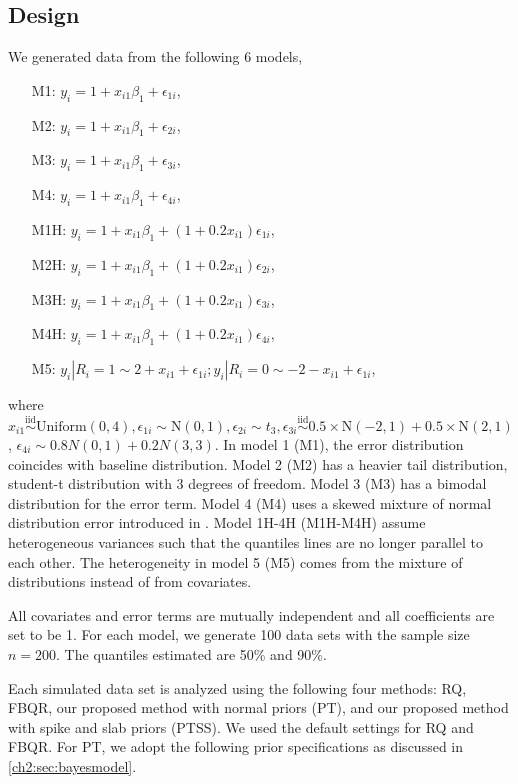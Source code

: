 \documentclass[12pt]{article}
\begin{document}
\subsection{Design}
We generated data from the following 6 models,
\begin{itemize}
\item [M1:] $y_i = 1 + x_{i1}\beta_1 + \epsilon_{1i}$,
\item [M2:] $y_i = 1 + x_{i1}\beta_1 + \epsilon_{2i}$,
\item [M3:] $y_i = 1 + x_{i1}\beta_1 + \epsilon_{3i}$,
\item [M4:] $y_i = 1 + x_{i1}\beta_1 + \epsilon_{4i}$,
\item [M1H:] $y_i = 1 + x_{i1}\beta_1 + (1 + 0.2x_{i1})
  \epsilon_{1i}$,
\item [M2H:] $y_i = 1 + x_{i1}\beta_1 + (1 + 0.2x_{i1})
  \epsilon_{2i}$,
\item [M3H:] $y_i = 1 + x_{i1}\beta_1 + (1 + 0.2x_{i1})
  \epsilon_{3i}$,
\item [M4H:] $y_i = 1 + x_{i1}\beta_1 + (1 + 0.2x_{i1})
  \epsilon_{4i}$,
\item [M5:] $y_{i} | R_i = 1 \sim 2 + x_{i1} + \epsilon_{1i}; y_{i}|
  R_i = 0 \sim -2 - x_{i1} + \epsilon_{1i}$,
\end{itemize}
where $x_{i1} \stackrel{\mbox{iid}}{\sim} \mathrm{Uniform}(0,4), \epsilon_{1i} \sim \mathrm{N}(0,1), \epsilon_{2i} \sim t_3, \epsilon_{3i} \stackrel{\mbox{iid}}{\sim} 0.5 \times \mathrm{N}(-2,1) + 0.5 \times \mathrm{N}(2,1)$, $\epsilon_{4i} \sim 0.8 N(0,1) + 0.2 N(3,3)$.
In model 1 (M1), the error distribution coincides with baseline distribution.
Model 2 (M2) has a heavier tail distribution, student-t distribution with 3 degrees of freedom.
Model 3 (M3) has a bimodal distribution for the error term.
Model 4 (M4) uses a skewed mixture of normal distribution error introduced in \citet{reich2010}.
Model 1H-4H (M1H-M4H) assume heterogeneous variances such that the quantiles lines are no longer parallel to each other.
The heterogeneity in model 5 (M5) comes from the mixture of distributions instead of from covariates.

All covariates and error terms are mutually independent and all coefficients are set to be 1.
For each model, we generate 100 data sets with the sample size $n=200$.
The quantiles estimated are 50\% and 90\%.

Each simulated data set is analyzed using the following four methods:
RQ, FBQR, our proposed method with normal priors (PT), and our proposed method with spike and slab priors (PTSS).
We used the default settings for RQ and FBQR.
For PT, we adopt the following prior specifications as discussed in \ref{ch2:sec:bayesmodel}.
\end{document}
